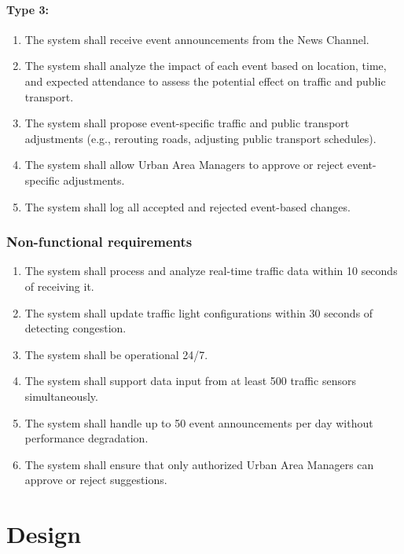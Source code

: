 \documentclass[11.5pt]{article}
\begin{document}
    \paragraph{Type 3:}
    \begin{enumerate}
        \item The system shall receive event announcements from the News Channel.

        \item The system shall analyze the impact of each event based on location,
            time, and expected attendance to assess the potential effect on traffic
            and public transport.

        \item The system shall propose event-specific traffic and public transport adjustments (e.g., rerouting roads, adjusting public transport schedules).

        \item The system shall allow Urban Area Managers to approve or reject event-specific
            adjustments.

        \item The system shall log all accepted and rejected event-based changes.
    \end{enumerate}
    \subsubsection{Non-functional requirements}
    \begin{enumerate}
        \item The system shall process and analyze real-time traffic data within 10 seconds of receiving it.
        \item The system shall update traffic light configurations within 30 seconds of detecting congestion.
        \item The system shall be operational 24/7.
        \item The system shall support data input from at least 500 traffic sensors simultaneously.
        \item The system shall handle up to 50 event announcements per day without performance degradation.
        \item The system shall ensure that only authorized Urban Area Managers can approve or reject suggestions.

    \end{enumerate}
    \section{Design}
\end{document}
